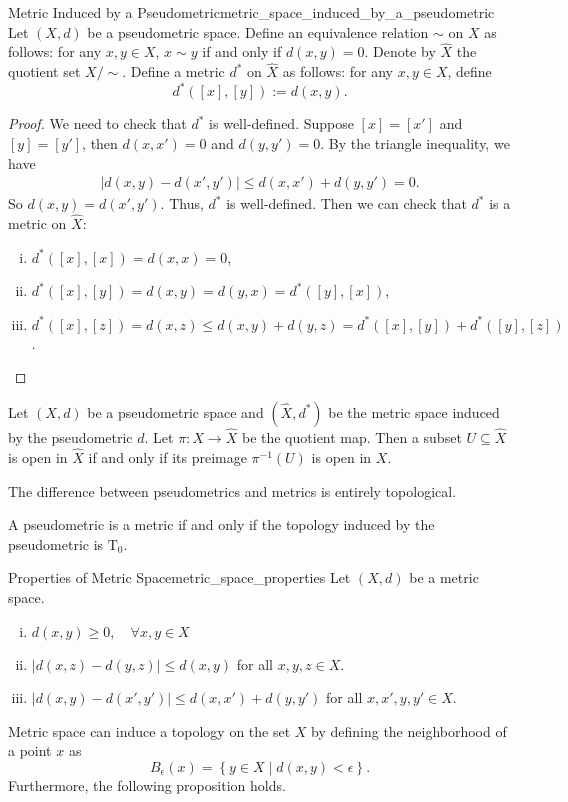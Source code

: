 \documentclass{report}
\begin{document}
\begin{definition}{Metric Induced by a Pseudometric}{metric_space_induced_by_a_pseudometric}
	Let $(X,d)$ be a pseudometric space. Define an equivalence relation $\sim$ on $X$ as follows: for any $x,y\in X$, $x\sim y$ if and only if $d(x,y)=0$. Denote by $\widehat{X}$ the quotient set $X/\sim$. Define a metric $d^*$ on $\widehat{X}$ as follows: for any $x,y\in X$, define
	\[
		d^*([x],[y]):=d(x,y).
	\]
\end{definition}
\begin{proof}
	We need to check that $d^*$ is well-defined. Suppose $[x]=[x']$ and $[y]=[y']$, then $d(x,x')=0$ and $d(y,y')=0$. By the triangle inequality, we have
	\begin{align*}
		|d(x,y)-d(x',y')|\le d(x,x')+d(y,y')=0.
	\end{align*}
	So $d(x,y)=d(x',y')$. Thus, $d^*$ is well-defined.
	Then we can check that $d^*$ is a metric on $\widehat{X}$:
	\begin{enumerate}[(i)]
		\item $d^*([x],[x])=d(x,x)=0$,
		\item $d^*([x],[y])=d(x,y)=d(y,x)=d^*([y],[x])$,
		\item $d^*([x],[z])=d(x,z)\le d(x,y)+d(y,z)=d^*([x],[y])+d^*([y],[z])$.
	\end{enumerate}
\end{proof}

\begin{proposition}{}{}
	Let $(X,d)$ be a pseudometric space and $(\widehat{X},d^*)$ be the metric space induced by the pseudometric $d$. Let $\pi:X\to \widehat{X}$ be the quotient map. Then a subset $U \subseteq\widehat{X}$ is open in $\widehat{X}$ if and only if its preimage $\pi^{-1}(U)$ is open in $X$.
\end{proposition}

The difference between pseudometrics and metrics is entirely topological. 
\begin{proposition}{}{}
	A pseudometric is a metric if and only if the topology induced by the pseudometric is $\mathrm{T}_0$.
\end{proposition}

\begin{proposition}{Properties of Metric Space}{metric_space_properties}
	Let $(X,d)$ be a metric space.
	\begin{enumerate}[(i)]
		\item $d(x,y)\ge 0,\quad\forall x,y\in X$
		\item $|d(x,z)-d(y,z)|\le d(x,y)$ for all $x,y,z\in X$.
		\item $|d(x,y)-d(x',y')|\le d(x,x')+d(y,y')$ for all $x,x',y,y'\in X$.
	\end{enumerate}
\end{proposition}
Metric space can induce a topology on the set $X$ by defining the neighborhood of a point $x$ as
\[
	B_\epsilon(x)=\left\{y\in X\mid d(x,y)<\epsilon \right\}.
\]
Furthermore, the following proposition holds.
\end{document}
